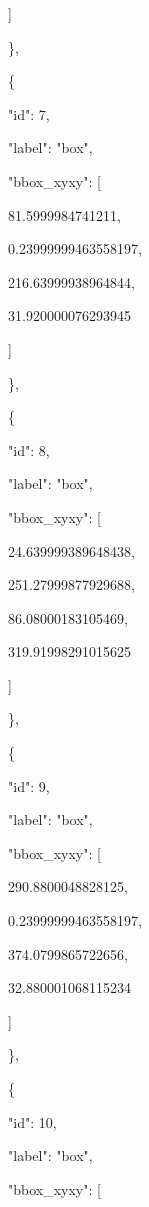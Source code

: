\documentclass[10pt,a4paper]{article}
\begin{document}
      ]\par
    \},\allowbreak{}\par
    \{\par
      "id":\allowbreak{} 7,\allowbreak{}\par
      "label":\allowbreak{} "box",\allowbreak{}\par
      "bbox\_xyxy":\allowbreak{} [\par
        81.5999984741211,\allowbreak{}\par
        0.23999999463558197,\allowbreak{}\par
        216.63999938964844,\allowbreak{}\par
        31.920000076293945\par
      ]\par
    \},\allowbreak{}\par
    \{\par
      "id":\allowbreak{} 8,\allowbreak{}\par
      "label":\allowbreak{} "box",\allowbreak{}\par
      "bbox\_xyxy":\allowbreak{} [\par
        24.639999389648438,\allowbreak{}\par
        251.27999877929688,\allowbreak{}\par
        86.08000183105469,\allowbreak{}\par
        319.91998291015625\par
      ]\par
    \},\allowbreak{}\par
    \{\par
      "id":\allowbreak{} 9,\allowbreak{}\par
      "label":\allowbreak{} "box",\allowbreak{}\par
      "bbox\_xyxy":\allowbreak{} [\par
        290.8800048828125,\allowbreak{}\par
        0.23999999463558197,\allowbreak{}\par
        374.0799865722656,\allowbreak{}\par
        32.880001068115234\par
      ]\par
    \},\allowbreak{}\par
    \{\par
      "id":\allowbreak{} 10,\allowbreak{}\par
      "label":\allowbreak{} "box",\allowbreak{}\par
      "bbox\_xyxy":\allowbreak{} [\par
\end{document}
